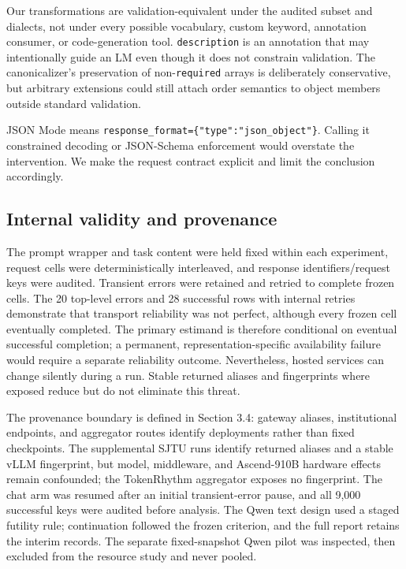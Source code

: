 \documentclass[11pt,a4paper]{article}
\begin{document}
Our transformations are validation-equivalent under the audited subset and dialects, not under every possible vocabulary, custom keyword, annotation consumer, or code-generation tool. \texttt{description} is an annotation that may intentionally guide an LM even though it does not constrain validation. The canonicalizer's preservation of non-\texttt{required} arrays is deliberately conservative, but arbitrary extensions could still attach order semantics to object members outside standard validation.

JSON Mode means \texttt{response\allowbreak{}\_format=\allowbreak{}\{"type":\allowbreak{}"json\_ob\allowbreak{}ject"\}}. Calling it constrained decoding or JSON-Schema enforcement would overstate the intervention. We make the request contract explicit and limit the conclusion accordingly.

\subsection{Internal validity and provenance}
The prompt wrapper and task content were held fixed within each experiment, request cells were deterministically interleaved, and response identifiers/request keys were audited. Transient errors were retained and retried to complete frozen cells. The 20 top-level errors and 28 successful rows with internal retries demonstrate that transport reliability was not perfect, although every frozen cell eventually completed. The primary estimand is therefore conditional on eventual successful completion; a permanent, representation-specific availability failure would require a separate reliability outcome. Nevertheless, hosted services can change silently during a run. Stable returned aliases and fingerprints where exposed reduce but do not eliminate this threat.

The provenance boundary is defined in Section 3.4: gateway aliases, institutional endpoints, and aggregator routes identify deployments rather than fixed checkpoints. The supplemental SJTU runs identify returned aliases and a stable vLLM fingerprint, but model, middleware, and Ascend-910B hardware effects remain confounded; the TokenRhythm aggregator exposes no fingerprint. The chat arm was resumed after an initial transient-error pause, and all 9,000 successful keys were audited before analysis. The Qwen text design used a staged futility rule; continuation followed the frozen criterion, and the full report retains the interim records. The separate fixed-snapshot Qwen pilot was inspected, then excluded from the resource study and never pooled.
\end{document}
